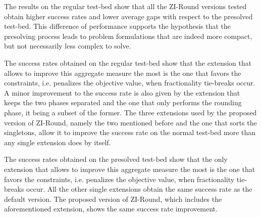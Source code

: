 \documentclass[a4paper,12pt]{book}
\begin{document}
The results on the regular test-bed show that all the ZI-Round versions tested obtain higher success rates and lower average gaps with respect to the presolved test-bed. This difference of performance supports the hypothesis that the presolving process leads to problem formulations that are indeed more compact, but not necessarily less complex to solve. \par

The success rates obtained on the regular test-bed show that the extension that allows to improve this aggregate measure the most is the one that favors the constraints, i.e. penalizes the objective value, when fractionality tie-breaks occur. A minor improvement to the success rate is also given by the extension that keeps the two phases separated and the one that only performs the rounding phase, it being a subset of the former.
The three extensions used by the proposed version of ZI-Round, namely the two mentioned before and the one that sorts the singletons, allow it to improve the success rate on the normal test-bed more than any single extension does by itself. \par 

The success rates obtained on the presolved test-bed show that the only extension that allows to improve this aggregate measure the most is the one that favors the constraints, i.e. penalizes the objective value, when fractionality tie-breaks occur. All the other single extensions obtain the same success rate as the default version.
The proposed version of ZI-Round, which includes the aforementioned extension, shows the same success rate improvement. \par
\end{document}
